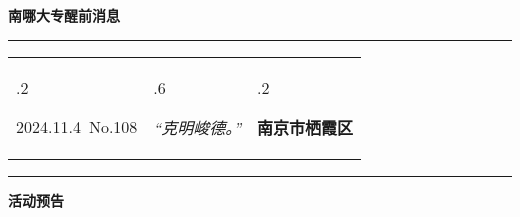 \documentclass[letterpaper, 12pt]{article}
\begin{document}
\begin{center}
    \Huge\textbf{南哪大专醒前消息}
\end{center}
\vspace{4mm}
\hrule
\renewcommand\tabularxcolumn[1]{m{#1}}
\begin{tabularx}{\textwidth}{>{\hsize.2\hsize}X>{\hsize.6\hsize}X>{\hsize.2\hsize}X}
    \begin{flushleft}
        2024.11.4\, No.108
    \end{flushleft}
    &
    \begin{center}
        \textit{“克明峻德。”}
    \end{center}
    &
    \begin{flushright}
        \textbf{南京市栖霞区}
    \end{flushright}
\end{tabularx}
\vspace{-3.5mm}
\hrule
\vspace{4mm}
\centerline{\huge\textbf{活动预告}}
\end{document}
